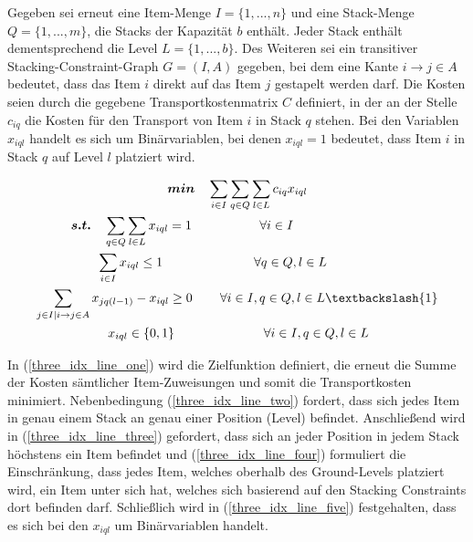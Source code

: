 Gegeben sei erneut eine Item-Menge $I = \{1, ..., n\}$ und eine Stack-Menge $Q = \{1, ..., m\}$, die Stacks der Kapazität $b$ enthält.
Jeder Stack enthält dementsprechend die Level $L = \{1, ..., b\}$. Des Weiteren sei ein transitiver Stacking-Constraint-Graph
$G = (I, A)$ gegeben, bei dem eine Kante $i \rightarrow j \in A$ bedeutet, dass das Item $i$ direkt auf das Item $j$ gestapelt werden darf.
Die Kosten seien durch die gegebene Transportkostenmatrix $C$ definiert, in der an der Stelle $c_{iq}$ die Kosten für den
Transport von Item $i$ in Stack $q$ stehen. Bei den Variablen $x_{iql}$ handelt es sich um Binärvariablen,
bei denen $x_{iql} = 1$ bedeutet, dass Item $i$ in Stack $q$ auf Level $l$ platziert wird.

\begin{gather}
\boldsymbol{min} \quad \sum_{i \in I} \sum_{q \in Q} \sum_{l \in L} c_{iq} x_{iql} \label{three_idx_line_one} \\
\boldsymbol{s.t.} \quad \sum_{q \in Q} \sum_{l \in L} x_{iql} = 1 \quad\thinspace\thinspace\quad\quad\quad\quad \forall i \in I \thinspace\thinspace\quad\quad\quad\quad\quad\quad\quad\quad\thinspace\thinspace \label{three_idx_line_two} \\
\sum_{i \in I} x_{iql} \leq 1 \thinspace\quad\quad\quad\quad\quad\quad\quad \forall q \in Q, l \in L \thinspace\thinspace\thinspace\thinspace\quad\quad\quad\thinspace \label{three_idx_line_three} \\
\sum_{j \in I | i \rightarrow j \in A} x_{jq(l-1)} - x_{iql} \geq 0 \thinspace\quad\quad \forall i \in I, q \in Q, l \in L \textbackslash \{1\}
\label{three_idx_line_four} \\
\quad\quad x_{iql} \in \{0, 1\} \quad\quad\quad\quad\quad\quad\quad \forall i \in I, q \in Q, l \in L \quad\thinspace\thinspace\thinspace\thinspace\thinspace \label{three_idx_line_five}
\end{gather}

In (\ref{three_idx_line_one}) wird die Zielfunktion definiert, die erneut die Summe der Kosten sämtlicher Item-Zuweisungen
und somit die Transportkosten minimiert.
Nebenbedingung (\ref{three_idx_line_two}) fordert, dass sich jedes Item in genau einem Stack an genau einer Position (Level) befindet.
Anschließend wird in (\ref{three_idx_line_three}) gefordert, dass sich an jeder Position in jedem Stack höchstens ein Item befindet und
(\ref{three_idx_line_four}) formuliert die Einschränkung, dass jedes Item, welches oberhalb des Ground-Levels platziert wird,
ein Item unter sich hat, welches sich basierend auf den Stacking Constraints dort befinden darf. Schließlich wird in (\ref{three_idx_line_five}) festgehalten, dass es sich bei den $x_{iql}$ um Binärvariablen handelt.

